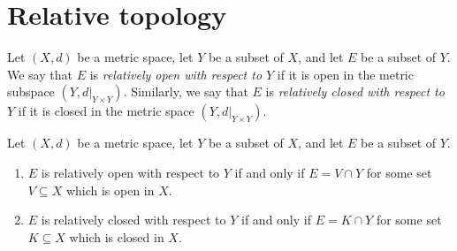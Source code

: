 \section{Relative topology}\label{sec 1.3}

\setcounter{theorem}{2}
\begin{definition}\label{1.3.3}
    Let \((X, d)\) be a metric space, let \(Y\) be a subset of \(X\), and let \(E\) be a subset of \(Y\).
    We say that \(E\) is \emph{relatively open with respect to \(Y\)} if it is open in the metric subspace \((Y, d|_{Y \times Y})\).
    Similarly, we say that \(E\) is \emph{relatively closed with respect to \(Y\)} if it is closed in the metric space \((Y, d|_{Y \times Y})\).
\end{definition}

\begin{proposition}\label{1.3.4}
    Let \((X, d)\) be a metric space, let \(Y\) be a subset of \(X\), and let \(E\) be a subset of \(Y\).
    \begin{enumerate}
        \item \(E\) is relatively open with respect to \(Y\) if and only if \(E = V \cap Y\) for some set \(V \subseteq X\) which is open in \(X\).
        \item \(E\) is relatively closed with respect to \(Y\) if and only if \(E = K \cap Y\) for some set \(K \subseteq X\) which is closed in \(X\).
    \end{enumerate}
\end{proposition}

